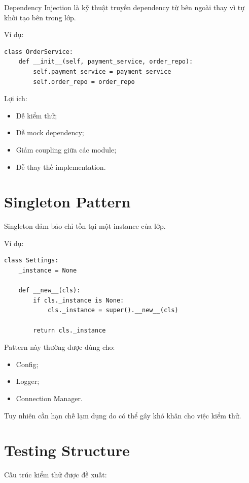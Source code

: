 \documentclass[12pt,a4paper]{article}
\begin{document}
Dependency Injection là kỹ thuật truyền dependency từ bên ngoài thay vì tự khởi tạo bên trong lớp.

Ví dụ:

\begin{lstlisting}
class OrderService:
    def __init__(self, payment_service, order_repo):
        self.payment_service = payment_service
        self.order_repo = order_repo
\end{lstlisting}

Lợi ích:

\begin{itemize}
    \item Dễ kiểm thử;
    \item Dễ mock dependency;
    \item Giảm coupling giữa các module;
    \item Dễ thay thế implementation.
\end{itemize}

\section{Singleton Pattern}

Singleton đảm bảo chỉ tồn tại một instance của lớp.

Ví dụ:

\begin{lstlisting}
class Settings:
    _instance = None

    def __new__(cls):
        if cls._instance is None:
            cls._instance = super().__new__(cls)

        return cls._instance
\end{lstlisting}

Pattern này thường được dùng cho:

\begin{itemize}
    \item Config;
    \item Logger;
    \item Connection Manager.
\end{itemize}

Tuy nhiên cần hạn chế lạm dụng do có thể gây khó khăn cho việc kiểm thử.

\section{Testing Structure}

Cấu trúc kiểm thử được đề xuất:
\end{document}
